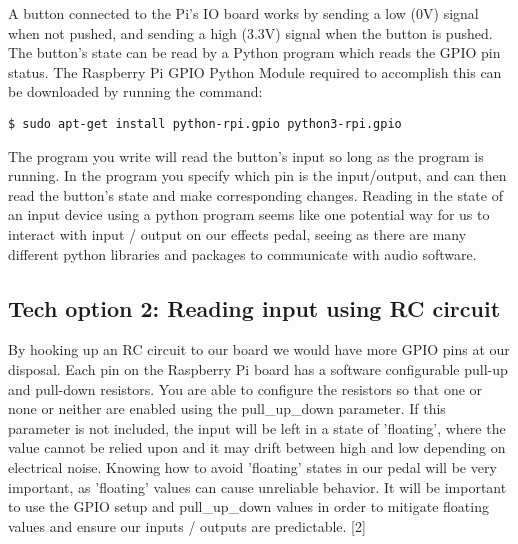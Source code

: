 \documentclass{article}
\begin{document}
A button connected to the Pi's IO board works by sending a low (0V) signal when not pushed, and sending a high (3.3V) signal when the button is pushed. The button's state can be read by a Python program which reads the GPIO pin status. The Raspberry Pi GPIO Python Module required to accomplish this can be downloaded by running the command:
\begin{verbatim}
$ sudo apt-get install python-rpi.gpio python3-rpi.gpio
\end{verbatim}
The program you write will read the button's input so long as the program is running. In the program you specify which pin is the input/output, and can then read the button's state and make corresponding changes. Reading in the state of an input device using a python program seems like one potential way for us to interact with input / output on our effects pedal, seeing as there are many different python libraries and packages to communicate with audio software. 

\subsection{Tech option 2: Reading input using RC circuit}
By hooking up an RC circuit to our board we would have more GPIO pins at our disposal. Each pin on the Raspberry Pi board has a software configurable pull-up and pull-down resistors. You are able to configure the resistors so that one or none or neither are enabled using the pull\_up\_down parameter. If this parameter is not included, the input will be left in a state of 'floating', where the value cannot be relied upon and it may drift between high and low depending on electrical noise. Knowing how to avoid 'floating' states in our pedal will be very important, as 'floating' values can cause unreliable behavior. It will be important to use the GPIO setup and pull\_up\_down values in order to mitigate floating values and ensure our inputs / outputs are predictable. 
[2]
\end{document}
